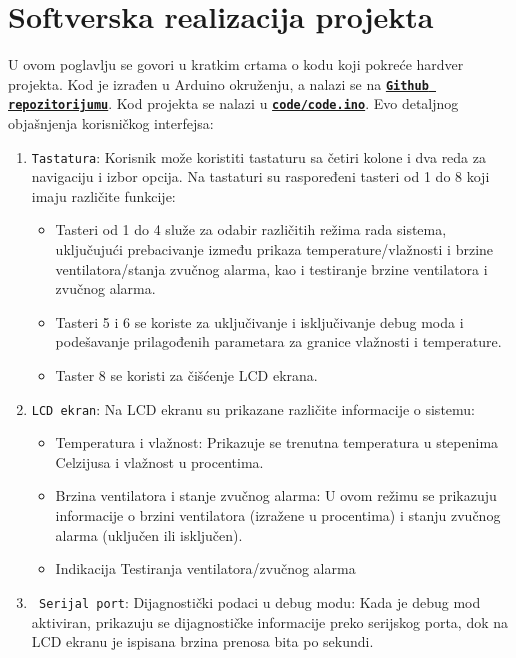 \documentclass[a4paper, 12pt]{article}
\begin{document}
\vspace{10pt}

\pagebreak
\endgroup

\begingroup
\sloppy

\section{Softverska realizacija projekta}

\vspace{10pt}

U ovom poglavlju se govori u kratkim crtama o kodu koji pokreće hardver projekta. Kod je izrađen u Arduino okruženju, a nalazi se na \textbf{\texttt{\href{https://github.com/vgalovic/temperature-and-humidity-regulator.git}{Github repozitorijumu}}}. Kod projekta se nalazi u  \textbf{\texttt{\href{https://github.com/vgalovic/temperature-and-humidity-regulator/blob/main/code/code.ino}{code/code.ino}}}. Evo detaljnog objašnjenja korisničkog interfejsa:
 
\begin{enumerate}

	\item \texttt{Tastatura}: Korisnik može koristiti tastaturu sa četiri kolone i dva reda za navigaciju i izbor opcija. Na tastaturi su raspoređeni tasteri od 1 do 8 koji imaju različite funkcije:
	\begin{itemize}
		\item Tasteri od 1 do 4 služe za odabir različitih režima rada sistema, uključujući prebacivanje između prikaza temperature/vlažnosti i brzine ventilatora/stanja zvučnog alarma, kao i testiranje brzine ventilatora i zvučnog alarma.
        \item Tasteri 5 i 6 se koriste za uključivanje i isključivanje debug moda i podešavanje prilagođenih parametara za granice vlažnosti i temperature.
        \item Taster 8 se koristi za čišćenje LCD ekrana.
	\end{itemize}
	
	
  	\item \texttt{LCD ekran}: Na LCD ekranu su prikazane različite informacije o sistemu:
  	\begin{itemize}
  		\item Temperatura i vlažnost: Prikazuje se trenutna temperatura u stepenima Celzijusa i vlažnost u procentima.
       	\item Brzina ventilatora i stanje zvučnog alarma: U ovom režimu se prikazuju informacije o brzini ventilatora (izražene u procentima) i stanju zvučnog alarma (uključen ili isključen).
		\item Indikacija Testiranja ventilatora/zvučnog alarma
  	\end{itemize}
  	
  	\item \texttt{ Serijal port}: Dijagnostički podaci u debug modu: Kada je debug mod aktiviran, prikazuju se dijagnostičke informacije preko serijskog porta, dok na LCD ekranu je ispisana brzina prenosa bita po sekundi.
\end{enumerate}
\end{document}
